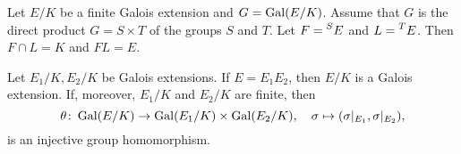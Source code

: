     
    

\begin{exercise}
    Let $E/K$ be a finite Galois extension and $G=\operatorname{Gal}(E/K)$.
    Assume that $G$ is the direct product
    $G=S\times T$
    of the groups $S$ and $T$. Let 
    $F=\prescript{S}{}{E}$ and
    $L=\prescript{T}{}{E}$. Then $F\cap L=K$ and $FL=E$.
\end{exercise}

\begin{proposition}
Let $E_1/K,E_2/K$ be Galois extensions. 
If $E=E_1E_2$, then $E/K$ is a Galois extension. If, moreover, $E_1/K$ and $E_2/K$ are finite,
then 
\[
\theta\colon \operatorname{Gal}(E/K)\to \operatorname{Gal}(E_1/K)\times\operatorname{Gal}(E_2/K),
\quad
\sigma\mapsto(\sigma|_{E_1},\sigma|_{E_2}),
\]
is an injective group homomorphism.
\end{proposition}

